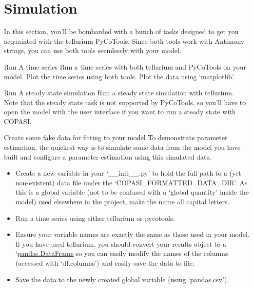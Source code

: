 \documentclass[../../main]{subfiles}
\begin{document}
\section{Simulation}
In this section, you'll be bombarded with a bunch of tasks designed to get you acquainted with the tellurium
PyCoTools. Since both tools work with Antimony strings, you can use both tools seemlessly
with your model.

\begin{Task}[label=TimeSeries]{Run A time series}
Run a time series with both tellurium and PyCoTools on your model. Plot the time series using both tools.
    Plot the data using `matplotlib'.
\end{Task}

\begin{Task}[label=SteadyState]{Run A steady state simulation}
    Run a steady state simulation with tellurium. Note that the steady state task is not supported by PyCoTools, so you'll have to open the model with the user interface
    if you want to run a steady state with COPASI.
\end{Task}

\begin{Task}[label=CreateFakeData]{Create some fake data for fitting to your model}
    To demonstrate parameter estimation, the quickest way is to simulate some data from the
    model you have built and configure a parameter estimation using this simulated data.
    \begin{itemize}
        \item Create a new variable in your `\_\_init\_\_.py' to hold the full path to a
        (yet non-existent) data file under the `COPASI\_FORMATTED\_DATA\_DIR'.
        As this is a global variable (not to be confused with a `global quantity' inside the model)
        used elsewhere in the project, make the name all capital letters.
        \item Run a time series using either tellurium or pycotools.
        \item Ensure your variable names are exactly the same as those used in your model. If you have used
        tellurium, you should convert your results object to a
        `\href{https://pandas.pydata.org/pandas-docs/stable/reference/api/pandas.DataFrame.html}{pandas.DataFrame} so you can easily
        modify the names of the columns (accessed with `df.columns') and easily save the data to file.
        \item Save the data to the newly created global variable (using `pandas.csv').
    \end{itemize}
\end{Task}
\end{document}
